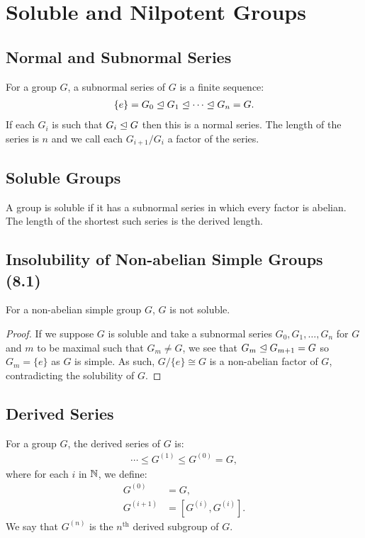 \section{Soluble and Nilpotent Groups}

\subsection{Normal and Subnormal Series}

For a group $G$, a subnormal series of $G$ is a finite sequence:
\begin{align*}
    \{e\} = G_0 \trianglelefteq G_1 \trianglelefteq \cdots \trianglelefteq G_n = G.
\end{align*} If each $G_i$ is such that $G_i \trianglelefteq G$ then this is a
normal series. The length of the series is $n$ and we call
each $G_{i + 1} / G_i$ a factor of the series.

\subsection{Soluble Groups}

A group is soluble if it has a subnormal series in which every
factor is abelian. The length of the shortest such series is the
derived length.

\subsection{Insolubility of Non-abelian Simple Groups (8.1)} \label{8.1}

For a non-abelian simple group $G$, $G$ is not soluble.

\begin{proof}
    If we suppose $G$ is soluble and take a subnormal series 
    $G_0, G_1, \ldots, G_n$ for $G$ and $m$ to be maximal such that 
    $G_m \neq G$, we see that $G_m \trianglelefteq G_{m + 1} = G$ so $G_m = \{e\}$ 
    as $G$ is simple. As such, $G / \{e\} \cong G$ is a non-abelian factor 
    of $G$, contradicting the solubility of $G$.
\end{proof}

\subsection{Derived Series}

For a group $G$, the derived series of $G$ is: \begin{align*}
    \cdots \leq G^{(1)} \leq G^{(0)} = G,
\end{align*} where for each $i$ in $\mathbb{N}$, we define:
\begin{align*}
    G^{(0)} &= G, \\
    G^{(i + 1)} &= [G^{(i)}, G^{(i)}].
\end{align*} We say that $G^{(n)}$ is the $n^{\text{th}}$ derived
subgroup of $G$.

